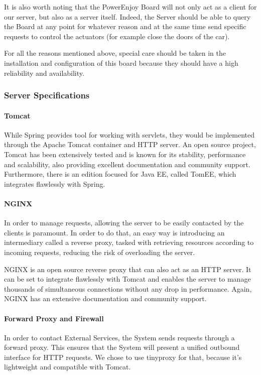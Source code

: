 \documentclass[12pt]{article}
\begin{document}
It is also worth noting that the PowerEnjoy Board will not only act as a client for our server, but also as a server itself. Indeed, the Server should be able to query the Board at any point for whatever reason and at the same time send specific requests to control the actuators (for example close the doors of the car).

For all the reasons mentioned above, special care should be taken in the installation and configuration of this board because they should have a high reliability and availability.

\subsubsection{Server Specifications}
\label{server}
\paragraph{Tomcat}\label{par:tomcat}
While Spring provides tool for working with servlets, they would be implemented through the Apache Tomcat container and HTTP server. An open source project, Tomcat has been extensively tested and is known for its stability, performance and scalability, also providing excellent documentation and community support. Furthermore, there is an edition focused for Java EE, called TomEE, which integrates flawlessly with Spring.

\paragraph{NGINX}\label{par:nginx}
In order to manage requests, allowing the server to be easily contacted by the clients is paramount. In order to do that, an easy way is introducing an intermediary called a reverse proxy, tasked with retrieving resources according to incoming requests, reducing the risk of overloading the server.

NGINX is an open source reverse proxy that can also act as an HTTP server. It can be set to integrate flawlessly with Tomcat and enables the server to manage thousands of simultaneous connections without any drop in performance. Again, NGINX has an extensive documentation and community support.

\paragraph{Forward Proxy and Firewall}
In order to contact External Services, the System sends requests through a forward proxy. This ensures that the System will present a unified outbound interface for HTTP requests. We chose to use tinyproxy for that, because it's lightweight and compatible with Tomcat.
\end{document}
